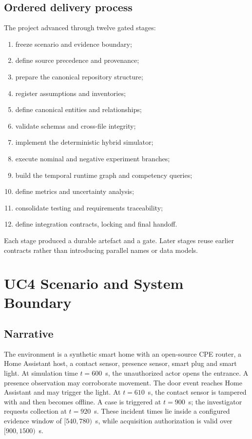 ﻿\documentclass[11pt,a4paper]{article}
\begin{document}
\subsection{Ordered delivery process}

The project advanced through twelve gated stages:

\begin{enumerate}
  \item freeze scenario and evidence boundary;
  \item define source precedence and provenance;
  \item prepare the canonical repository structure;
  \item register assumptions and inventories;
  \item define canonical entities and relationships;
  \item validate schemas and cross-file integrity;
  \item implement the deterministic hybrid simulator;
  \item execute nominal and negative experiment branches;
  \item build the temporal runtime graph and competency queries;
  \item define metrics and uncertainty analysis;
  \item consolidate testing and requirements traceability;
  \item define integration contracts, locking and final handoff.
\end{enumerate}

Each stage produced a durable artefact and a gate. Later stages reuse earlier contracts rather than introducing parallel names or data models.

\section{UC4 Scenario and System Boundary}

\subsection{Narrative}

The environment is a synthetic smart home with an open-source CPE router, a Home Assistant host, a contact sensor, presence sensor, smart plug and smart light. At simulation time $t=600$~s, the unauthorized actor opens the entrance. A presence observation may corroborate movement. The door event reaches Home Assistant and may trigger the light. At $t=610$~s, the contact sensor is tampered with and then becomes offline. A case is triggered at $t=900$~s; the investigator requests collection at $t=920$~s. These incident times lie inside a configured evidence window of $[540,780)$~s, while acquisition authorization is valid over $[900,1500)$~s.
\end{document}
